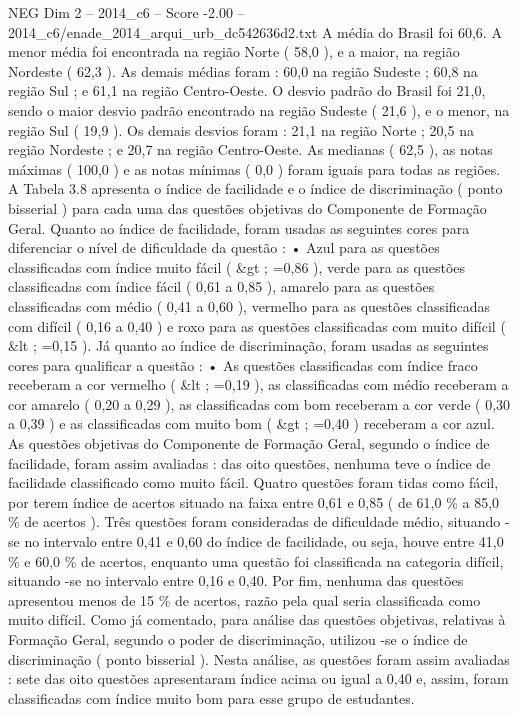 \begin{textsample}{NEG Dim 2 – 2014\_c6 – Score -2.00 – 2014\_c6/enade\_2014\_arqui\_urb\_dc542636d2.txt}
A média do Brasil foi 60,6.
A menor média foi encontrada na região Norte ( 58,0 ), e a maior, na região Nordeste ( 62,3 ).
As demais médias foram : 60,0 na região Sudeste ; 60,8 na região Sul ; e 61,1 na região Centro-Oeste.
O desvio padrão do Brasil foi 21,0, sendo o maior desvio padrão encontrado na região Sudeste ( 21,6 ), e o menor, na região Sul ( 19,9 ).
Os demais desvios foram : 21,1 na região Norte ; 20,5 na região Nordeste ; e 20,7 na região Centro-Oeste.
As medianas ( 62,5 ), as notas máximas ( 100,0 ) e as notas mínimas ( 0,0 ) foram iguais para todas as regiões.
A Tabela 3.8 apresenta o índice de facilidade e o índice de discriminação ( ponto bisserial ) para cada uma das questões objetivas do Componente de Formação Geral.
Quanto ao índice de facilidade, foram usadas as seguintes cores para diferenciar o nível de dificuldade da questão : • Azul para as questões classificadas com índice muito fácil ( \&gt ; =0,86 ), verde para as questões classificadas com índice fácil ( 0,61 a 0,85 ), amarelo para as questões classificadas com médio ( 0,41 a 0,60 ), vermelho para as questões classificadas com difícil ( 0,16 a 0,40 ) e roxo para as questões classificadas com muito difícil ( \&lt ; =0,15 ).
Já quanto ao índice de discriminação, foram usadas as seguintes cores para qualificar a questão : • As questões classificadas com índice fraco receberam a cor vermelho ( \&lt ; =0,19 ), as classificadas com médio receberam a cor amarelo ( 0,20 a 0,29 ), as classificadas com bom receberam a cor verde ( 0,30 a 0,39 ) e as classificadas com muito bom ( \&gt ; =0,40 ) receberam a cor azul.
As questões objetivas do Componente de Formação Geral, segundo o índice de facilidade, foram assim avaliadas : das oito questões, nenhuma teve o índice de facilidade classificado como muito fácil.
Quatro questões foram tidas como fácil, por terem índice de acertos situado na faixa entre 0,61 e 0,85 ( de 61,0 \% a 85,0 \% de acertos ).
Três questões foram consideradas de dificuldade médio, situando -se no intervalo entre 0,41 e 0,60 do índice de facilidade, ou seja, houve entre 41,0 \% e 60,0 \% de acertos, enquanto uma questão foi classificada na categoria difícil, situando -se no intervalo entre 0,16 e 0,40.
Por fim, nenhuma das questões apresentou menos de 15 \% de acertos, razão pela qual seria classificada como muito difícil.
Como já comentado, para análise das questões objetivas, relativas à Formação Geral, segundo o poder de discriminação, utilizou -se o índice de discriminação ( ponto bisserial ).
Nesta análise, as questões foram assim avaliadas : sete das oito questões apresentaram índice acima ou igual a 0,40 e, assim, foram classificadas com índice muito bom para esse grupo de estudantes.

\end{textsample}
